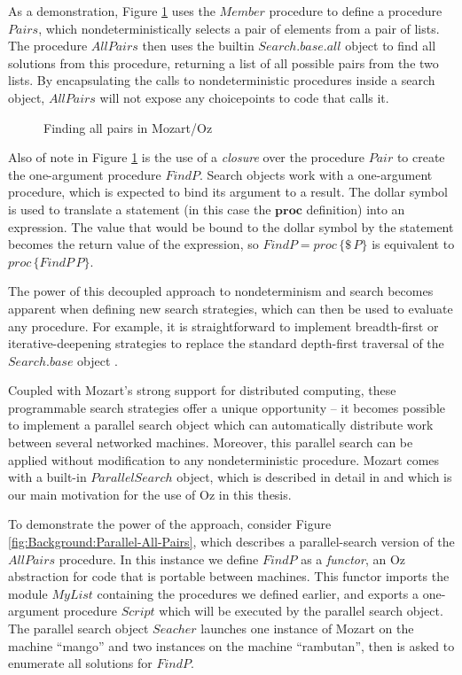 As a demonstration, Figure \ref{fig:Background:All-Pairs} uses the
$Member$ procedure to define a procedure $Pairs$, which nondeterministically
selects a pair of elements from a pair of lists. The procedure $AllPairs$
then uses the builtin $Search.base.all$ object to find all solutions
from this procedure, returning a list of all possible pairs from the
two lists. By encapsulating the calls to nondeterministic procedures
inside a search object, $AllPairs$ will not expose any choicepoints
to code that calls it.

%
\begin{figure}[t]

\caption{Finding all pairs in Mozart/Oz\label{fig:Background:All-Pairs}}

\end{figure}


Also of note in Figure \ref{fig:Background:All-Pairs} is the use
of a \emph{closure} over the procedure $Pair$ to create the one-argument
procedure $FindP$. Search objects work with a one-argument procedure,
which is expected to bind its argument to a result. The dollar symbol
is used to translate a statement (in this case the $\mathbf{proc}$
definition) into an expression. The value that would be bound to the
dollar symbol by the statement becomes the return value of the expression,
so $FindP=proc\,\{\$\, P\}$ is equivalent to $proc\,\{FindP\, P\}$.

The power of this decoupled approach to nondeterminism and search
becomes apparent when defining new search strategies, which can then
be used to evaluate any procedure. For example, it is straightforward
to implement breadth-first or iterative-deepening strategies to replace
the standard depth-first traversal of the $Search.base$ object \citep{schulte00constraint_services}.

Coupled with Mozart's strong support for distributed computing, these
programmable search strategies offer a unique opportunity -- it becomes
possible to implement a parallel search object which can automatically
distribute work between several networked machines. Moreover, this
parallel search can be applied without modification to any nondeterministic
procedure. Mozart comes with a built-in $ParallelSearch$ object,
which is described in detail in \citep{schulte00oz_parallel} and
which is our main motivation for the use of Oz in this thesis.

To demonstrate the power of the approach, consider Figure \ref{fig:Background:Parallel-All-Pairs},
which describes a parallel-search version of the $AllPairs$ procedure.
In this instance we define $FindP$ as a \emph{functor}, an Oz abstraction
for code that is portable between machines. This functor imports the
module $MyList$ containing the procedures we defined earlier, and
exports a one-argument procedure $Script$ which will be executed
by the parallel search object. The parallel search object $Seacher$
launches one instance of Mozart on the machine {}``mango'' and two
instances on the machine {}``rambutan'', then is asked to enumerate
all solutions for $FindP$.

